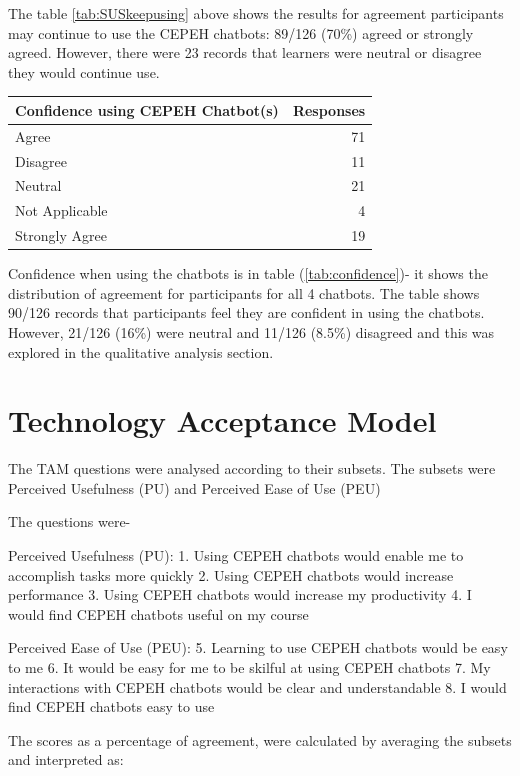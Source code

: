 \documentclass[a4paper, nobind]{templates/ociamthesis}
\begin{document}
The table \ref{tab:SUSkeepusing} above shows the results for agreement participants may
continue to use the CEPEH chatbots: 89/126 (70\%) agreed or strongly agreed. However, there were 23 records that learners were neutral or disagree they would continue use.

\begin{longtable}[]{@{}lr@{}}
\toprule()
Confidence using CEPEH Chatbot(s) & Responses \\
\midrule()
\endhead
Agree & 71 \\
Disagree & 11 \\
Neutral & 21 \\
Not Applicable & 4 \\
Strongly Agree & 19 \\
\bottomrule()
\end{longtable}

Confidence when using the chatbots is in table (\ref{tab:confidence})- it shows the distribution of agreement for participants for all
4 chatbots. The table shows 90/126 records that participants feel they are confident in using the chatbots. However, 21/126 (16\%) were neutral and 11/126 (8.5\%) disagreed and this was explored in the qualitative analysis section.

\hypertarget{technology-acceptance-model}{%
\section{Technology Acceptance Model}\label{technology-acceptance-model}}

The TAM questions were analysed according to their subsets. The subsets
were Perceived Usefulness (PU) and Perceived Ease of Use (PEU)

The questions were-

Perceived Usefulness (PU):
1. Using CEPEH chatbots would enable me to accomplish tasks more
quickly
2. Using CEPEH chatbots would increase performance
3. Using CEPEH chatbots would increase my productivity
4. I would find CEPEH chatbots useful on my course

Perceived Ease of Use (PEU):
5. Learning to use CEPEH chatbots would be easy to me
6. It would be easy for me to be skilful at using CEPEH chatbots
7. My interactions with CEPEH chatbots would be clear and understandable
8. I would find CEPEH chatbots easy to use

The scores as a percentage of agreement, were calculated by averaging the subsets and interpreted as:
\end{document}
